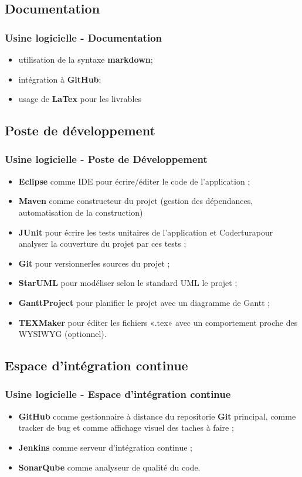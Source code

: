 \documentclass{beamer}
\begin{document}
\subsection{Documentation}
\begin{frame}[label=documentation]
  \frametitle{Usine logicielle - Documentation}
  \begin{itemize}
  \item utilisation de la syntaxe \textbf{markdown};
  \item intégration à \textbf{GitHub};
  \item usage de \textbf{LaTex} pour les livrables
\end{itemize}
\end{frame}

\subsection{Poste de développement}
\begin{frame}[label=posteDeveloppement]
  \frametitle{Usine logicielle - Poste de Développement}
  \begin{itemize}
  \item \textbf{Eclipse} comme IDE pour écrire/éditer le code de l'application ;
  \item \textbf{Maven} comme constructeur du projet (gestion des dépendances, automatisation de la construction)
  \item \textbf{JUnit} pour écrire les tests unitaires de l'application et Coderturapour analyser la couverture du projet par ces tests ;
  \item \textbf{Git} pour versionnerles sources du projet ;
  \item \textbf{StarUML} pour modéliser selon le standard UML le projet ;
  \item \textbf{GanttProject} pour planifier le projet avec un diagramme de Gantt ;
  \item \textbf{TEXMaker} pour éditer les fichiers «.tex» avec un comportement proche des WYSIWYG (optionnel).
\end{itemize}  
\end{frame}

\subsection{Espace d'intégration continue}
\begin{frame}[label=integrationContinue]
  \frametitle{Usine logicielle - Espace d’intégration continue}
  \begin{itemize}
  \item \textbf{GitHub} comme gestionnaire à distance du repositorie \textbf{Git} principal, comme tracker de bug et comme affichage visuel des taches à faire ;
  \item \textbf{Jenkins} comme serveur d'intégration continue ;
  \item \textbf{SonarQube} comme analyseur de qualité du code.
  \end{itemize}
\end{frame}
\end{document}
